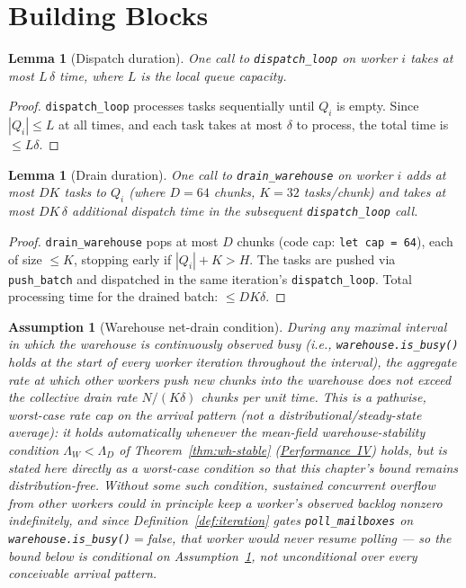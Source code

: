 \documentclass[11pt,a4paper]{article}
\newtheorem{lemma}[theorem]{Lemma}
\newtheorem{assumption}{Assumption}[section]
\newcommand{\code}[1]{\texttt{#1}}
\begin{document}
\section{Building Blocks}

\begin{lemma}[Dispatch duration]
\label{lem:dispatch}
One call to \code{dispatch\_loop} on worker $i$ takes at most
$L\,\delta$ time, where $L$ is the local queue capacity.
\end{lemma}

\begin{proof}
\code{dispatch\_loop} processes tasks sequentially until $Q_i$ is
empty.  Since $|Q_i| \leq L$ at all times, and each task takes at
most $\delta$ to process, the total time is $\leq L\delta$.
\end{proof}

\begin{lemma}[Drain duration]
\label{lem:drain}
One call to \code{drain\_warehouse} on worker $i$ adds at most
$DK$ tasks to $Q_i$ (where $D=64$ chunks, $K=32$ tasks/chunk)
and takes at most $DK\,\delta$ additional dispatch time in the
subsequent \code{dispatch\_loop} call.
\end{lemma}

\begin{proof}
\code{drain\_warehouse} pops at most $D$ chunks (code cap:
\code{let cap = 64}), each of size $\leq K$, stopping early if
$|Q_i| + K > H$.  The tasks are pushed via \code{push\_batch}
and dispatched in the same iteration's \code{dispatch\_loop}.
Total processing time for the drained batch: $\leq DK\delta$.
\end{proof}

\begin{assumption}[Warehouse net-drain condition]
\label{ass:wh-net-drain}
During any maximal interval in which the warehouse is continuously
observed busy (i.e., \code{warehouse.is\_busy()} holds at the start of
every worker iteration throughout the interval), the aggregate rate at
which \emph{other} workers push new chunks into the warehouse does not
exceed the collective drain rate $N/(K\delta)$ chunks per unit time.
This is a pathwise, worst-case rate cap on the arrival pattern (not a
distributional/steady-state average): it holds automatically whenever
the mean-field warehouse-stability condition
$\Lambda_W < \Lambda_D$ of Theorem~\ref{thm:wh-stable}
(\hyperref[chap:stability]{Performance~IV}) holds, but is stated here
directly as a worst-case condition so that this chapter's bound remains
distribution-free. Without some such condition, sustained concurrent
overflow from other workers could in principle keep a worker's
observed backlog nonzero indefinitely, and since
Definition~\ref{def:iteration} gates \code{poll\_mailboxes} on
\code{warehouse.is\_busy()}$=$false, that worker would never resume
polling --- so the bound below is conditional on
Assumption~\ref{ass:wh-net-drain}, not unconditional over every
conceivable arrival pattern.
\end{assumption}
\end{document}
